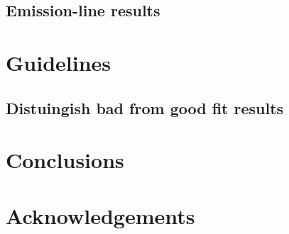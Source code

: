 \documentclass[usenatbib,usegraphicx,useAMS]{mn2e}
\begin{document}
\subsection{Emission-line results}

\section{Guidelines}
\subsection{}
\subsection{Distuingish bad from good fit results}

\section{Conclusions}

\section*{Acknowledgements}


%
%
\end{document}
